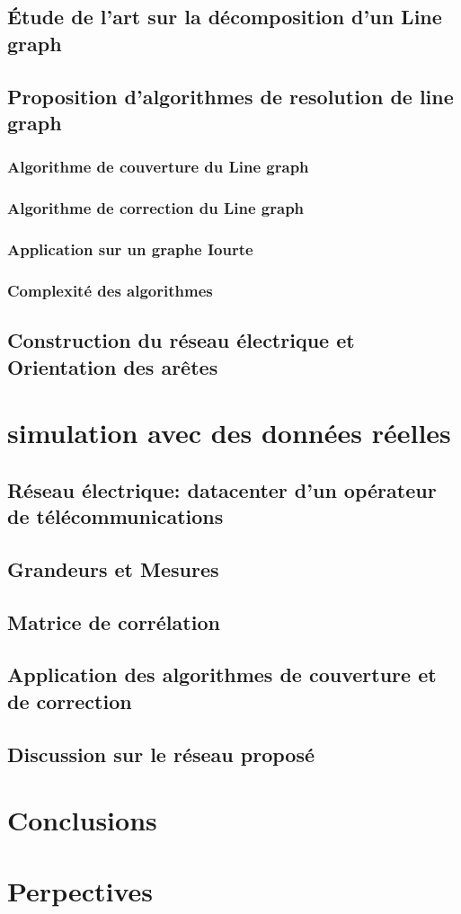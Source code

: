 	\section{\'Etude de l'art sur la d\'ecomposition d'un Line graph}
	\section{Proposition d'algorithmes de resolution de line graph}
		\subsection{Algorithme de couverture du Line graph}
		\subsection{Algorithme de correction du Line graph}
		\subsection{Application sur un graphe Iourte}
		\subsection{Complexit\'e des algorithmes}
	\section{Construction du r\'eseau \'electrique et Orientation des ar\^etes }
\chapter{simulation avec des donn\'ees r\'eelles}
	\section{R\'eseau \'electrique: datacenter d'un op\'erateur de t\'el\'ecommunications }
	\section{Grandeurs et Mesures}
	\section{Matrice de corr\'elation}
	\section{Application des algorithmes de couverture et de correction}
	\section{Discussion sur le r\'eseau propos\'e}
\chapter{Conclusions}
\chapter{Perpectives}
\tableofcontents
 